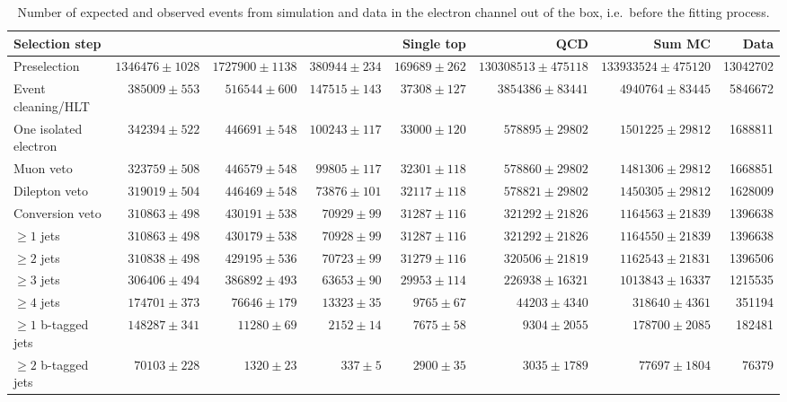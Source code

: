 \begin{table}
  \centering
   \caption[Number of expected and observed events from simulation and data in the electron channel]{Number of expected
   and observed events from simulation and data in the electron channel out of the box, i.e.\ before the fitting
   process.}
    \label{tab:event_yields_ejets}
    \resizebox{\columnwidth}{!} {
    \begin{tabular}{@{}lrrrrrrr@{}}
    \toprule
	\textbf{Selection step} & \textbf{\ttjets} & \textbf{\WpJets} & \textbf{\ZpJets} & \textbf{Single top} & \textbf{QCD} & \textbf{Sum MC} & \textbf{Data} \\
	\midrule
	Preselection  &  $1346476 \pm 1028$ &  $1727900 \pm 1138$ &  $380944 \pm 234$ &  $169689 \pm 262$ &  $130308513 \pm 475118$ &  $133933524 \pm 475120$ &  13042702 \\ 
	Event cleaning/HLT  &  $385009 \pm 553$ &  $516544 \pm 600$ &  $147515 \pm 143$ &  $37308 \pm 127$ &  $3854386 \pm 83441$ &  $4940764 \pm 83445$ &  5846672 \\ 
	One isolated electron  &  $342394 \pm 522$ &  $446691 \pm 548$ &  $100243 \pm 117$ &  $33000 \pm 120$ &  $578895 \pm 29802$ &  $1501225 \pm 29812$ &  1688811 \\ 
	Muon veto  &  $323759 \pm 508$ &  $446579 \pm 548$ &  $99805 \pm 117$ &  $32301 \pm 118$ &  $578860 \pm 29802$ &  $1481306 \pm 29812$ &  1668851 \\ 
	Dilepton veto  &  $319019 \pm 504$ &  $446469 \pm 548$ &  $73876 \pm 101$ &  $32117 \pm 118$ &  $578821 \pm 29802$ &  $1450305 \pm 29812$ &  1628009 \\ 
	Conversion veto  &  $310863 \pm 498$ &  $430191 \pm 538$ &  $70929 \pm 99$ &  $31287 \pm 116$ &  $321292 \pm 21826$ &  $1164563 \pm 21839$ &  1396638 \\ 
	$\geq 1$ jets  &  $310863 \pm 498$ &  $430179 \pm 538$ &  $70928 \pm 99$ &  $31287 \pm 116$ &  $321292 \pm 21826$ &  $1164550 \pm 21839$ &  1396638 \\ 
	$\geq 2$ jets  &  $310838 \pm 498$ &  $429195 \pm 536$ &  $70723 \pm 99$ &  $31279 \pm 116$ &  $320506 \pm 21819$ &  $1162543 \pm 21831$ &  1396506 \\ 
	$\geq 3$ jets  &  $306406 \pm 494$ &  $386892 \pm 493$ &  $63653 \pm 90$ &  $29953 \pm 114$ &  $226938 \pm 16321$ &  $1013843 \pm 16337$ &  1215535 \\ 
	$\geq 4$ jets  &  $174701 \pm 373$ &  $76646 \pm 179$ &  $13323 \pm 35$ &  $9765 \pm 67$ &  $44203 \pm 4340$ &  $318640 \pm 4361$ &  351194 \\ 
	$\geq 1$ b-tagged jets  &  $148287 \pm 341$ &  $11280 \pm 69$ &  $2152 \pm 14$ &  $7675 \pm 58$ &  $9304 \pm 2055$ &  $178700 \pm 2085$ &  182481 \\ 
	$\geq 2$ b-tagged jets  &  $70103 \pm 228$ &  $1320 \pm 23$ &  $337 \pm 5$ &  $2900 \pm 35$ &  $3035 \pm 1789$ &  $77697 \pm 1804$ &  76379 \\ 
	\bottomrule
	\end{tabular}
	}
\end{table}

